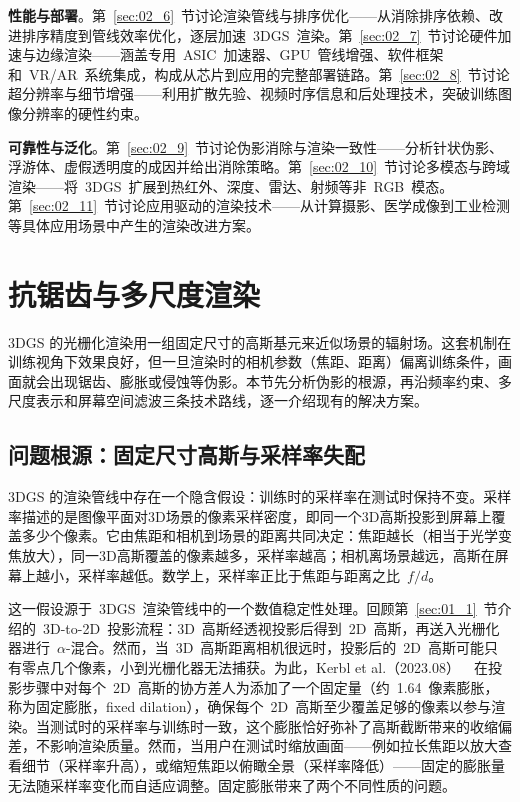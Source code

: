 \textbf{性能与部署}。第~\ref{sec:02_6}~节讨论渲染管线与排序优化——从消除排序依赖、改进排序精度到管线效率优化，逐层加速~3DGS~渲染。第~\ref{sec:02_7}~节讨论硬件加速与边缘渲染——涵盖专用~ASIC~加速器、GPU~管线增强、软件框架和~VR/AR~系统集成，构成从芯片到应用的完整部署链路。第~\ref{sec:02_8}~节讨论超分辨率与细节增强——利用扩散先验、视频时序信息和后处理技术，突破训练图像分辨率的硬性约束。

\textbf{可靠性与泛化}。第~\ref{sec:02_9}~节讨论伪影消除与渲染一致性——分析针状伪影、浮游体、虚假透明度的成因并给出消除策略。第~\ref{sec:02_10}~节讨论多模态与跨域渲染——将~3DGS~扩展到热红外、深度、雷达、射频等非~RGB~模态。第~\ref{sec:02_11}~节讨论应用驱动的渲染技术——从计算摄影、医学成像到工业检测等具体应用场景中产生的渲染改进方案。

\section{抗锯齿与多尺度渲染}
\label{sec:02_1}

3DGS 的光栅化渲染用一组固定尺寸的高斯基元来近似场景的辐射场。这套机制在训练视角下效果良好，但一旦渲染时的相机参数（焦距、距离）偏离训练条件，画面就会出现锯齿、膨胀或侵蚀等伪影。本节先分析伪影的根源，再沿频率约束、多尺度表示和屏幕空间滤波三条技术路线，逐一介绍现有的解决方案。

\subsection{问题根源：固定尺寸高斯与采样率失配}

3DGS 的渲染管线中存在一个隐含假设：训练时的采样率在测试时保持不变。采样率描述的是图像平面对3D场景的像素采样密度，即同一个3D高斯投影到屏幕上覆盖多少个像素。它由焦距和相机到场景的距离共同决定：焦距越长（相当于光学变焦放大），同一3D高斯覆盖的像素越多，采样率越高；相机离场景越远，高斯在屏幕上越小，采样率越低。数学上，采样率正比于焦距与距离之比~$f/d$。

这一假设源于~3DGS~渲染管线中的一个数值稳定性处理。回顾第~\ref{sec:01_1}~节介绍的~3D-to-2D~投影流程：3D~高斯经透视投影后得到~2D~高斯，再送入光栅化器进行~$\alpha$-混合。然而，当~3D~高斯距离相机很远时，投影后的~2D~高斯可能只有零点几个像素，小到光栅化器无法捕获。为此，Kerbl et al.（2023.08）~\cite{2308_04079}~在投影步骤中对每个~2D~高斯的协方差人为添加了一个固定量（约~1.64~像素膨胀，称为固定膨胀，fixed dilation），确保每个~2D~高斯至少覆盖足够的像素以参与渲染。当测试时的采样率与训练时一致，这个膨胀恰好弥补了高斯截断带来的收缩偏差，不影响渲染质量。然而，当用户在测试时缩放画面——例如拉长焦距以放大查看细节（采样率升高），或缩短焦距以俯瞰全景（采样率降低）——固定的膨胀量无法随采样率变化而自适应调整。固定膨胀带来了两个不同性质的问题。

